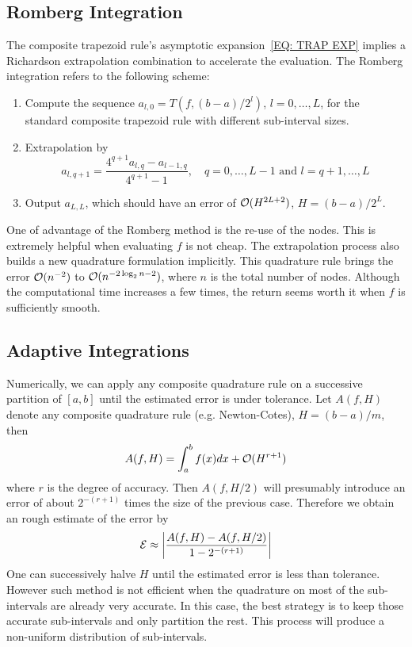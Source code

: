 \subsection{Romberg Integration}
The composite trapezoid rule's asymptotic expansion~\eqref{EQ: TRAP EXP} implies a Richardson extrapolation combination to accelerate the evaluation. The Romberg integration refers to the following scheme: 
\begin{enumerate}
    \item Compute the sequence $a_{l, 0} = T(f, (b-a)/2^l)$, $l=0,\dots, L$, for the standard composite trapezoid rule with different sub-interval sizes. 
    \item Extrapolation by 
    $$a_{l, q+1} = \frac{4^{q+1} a_{l, q} - a_{l-1, q}}{4^{q+1} - 1}, \quad q = 0,\dots, L-1 \text{ and } l = q+1,\dots, L$$
    \item Output $a_{L,L}$, which should have an error of $\mathcal O(H^{2L+2})$, $H = (b-a)/2^L$.
\end{enumerate}
\begin{remark}
    One of advantage of the Romberg method is the re-use of the nodes. This is extremely helpful when evaluating $f$ is not cheap. The extrapolation process also builds a new quadrature formulation implicitly. This quadrature rule brings the error $\mathcal O(n^{-2})$ to $\mathcal O(n^{-2\log_2 n-2})$, where $n$ is the total number of nodes. Although the computational time increases a few times, the return seems worth it when $f$ is sufficiently smooth.
\end{remark}
\subsection{Adaptive Integrations}
Numerically, we can apply any composite quadrature rule on a successive partition of $[a, b]$ until the estimated error is under tolerance. Let $A(f, H)$ denote any composite quadrature rule (e.g. Newton-Cotes), $H = (b-a)/m$, then 
\begin{equation}
    A(f, H) = \int_a^b f(x) dx + \mathcal O(H^{r+1})
\end{equation}
where $r$ is the degree of accuracy. Then $A(f, H/2)$ will presumably introduce an error of about $2^{-(r+1)}$ times the size of the previous case. Therefore we obtain an rough estimate of the error by 
$$\mathcal E \approx \left|\frac{A(f, H) - A(f, H/2)}{1 - 2^{-(r+1)}}\right|$$
One can successively halve $H$ until the estimated error is less than tolerance. However such method is not efficient when the quadrature on most of the sub-intervals are already very accurate. In this case, the best strategy is to keep those accurate sub-intervals and only partition the rest. This process will produce a non-uniform distribution of sub-intervals. 

